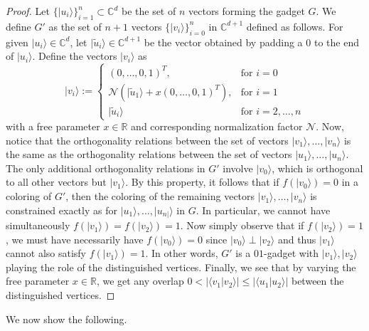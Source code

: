 \documentclass[twocolumn, a4paper, superscriptaddress,nofootinbib, accepted=2020-08-07, hyperref]{quantumarticle}
\begin{document}
\begin{proof}
Let $\{|u_i\rangle\}_{i=1}^n\subset \mathbb{C}^d$ be the set of $n$ vectors forming the gadget $G$. We define $G'$ as the set of $n+1$ vectors $\{|v_i\rangle\}_{i=0}^n$ in $\mathbb{C}^{d+1}$ defined as follows. For given $|u_i \rangle \in \mathbb{C}^{d}$, let $|\tilde{u}_i \rangle \in \mathbb{C}^{d+1}$ be the vector obtained by padding a $0$ to the end of $|u_i \rangle$. Define the vectors $|v_i \rangle$ as
	\[
	|v_i \rangle := \left\{\begin{array}{lr}
	(0,\dots,0, 1)^T, & \text{for } i = 0\\
	\mathcal{N}\left(|\tilde{u}_1\rangle + x (0,\dots,0, 1)^T\right), & \text{for } i=1\\
	|\tilde{u}_i \rangle & \text{for } i = 2, \dots, n
	\end{array}\right.
	\] 
	with a free parameter $x \in \mathbb{R}$ and corresponding normalization factor $\mathcal{N}$. 
Now, notice that the orthogonality relations between the set of vectors $|v_1 \rangle, \dots, |v_{n} \rangle$ is the same as the orthogonality relations between the set of vectors $|u_1 \rangle, \dots, |u_{n} \rangle$. The only additional orthogonality relations in $G'$ involve $|v_0\rangle$, which is orthogonal to all other vectors but $|v_1\rangle$. By this property, it follows that if $f(|v_0\rangle)=0$ in a coloring of $G'$, then the coloring of the remaining vectors $|v_1 \rangle, \dots, |v_{n} \rangle$ is constrained exactly as for $|u_1 \rangle, \dots, |u_{n|} \rangle$ in $G$. In particular, we cannot have simultaneously $f(|v_1\rangle)=f(|v_2\rangle)=1$. Now simply observe that if $f(|v_2\rangle)=1$, we must have necessarily have $f(|v_0\rangle)=0$ since $|v_0 \rangle \perp |v_2 \rangle$ and thus $|v_1\rangle$ cannot also satisfy $f(|v_1\rangle) = 1$. In other words, $G'$ is a $01$-gadget with $|v_1\rangle, |v_2\rangle$ playing the role of the distinguished vertices. Finally, we see that by varying the free parameter $x \in \mathbb{R}$, we get  any overlap $0< |\langle v_1|v_2\rangle|\leq |\langle u_1|u_2\rangle|$ between the distinguished vertices. 
\end{proof}



We now show the following.  
\end{document}
